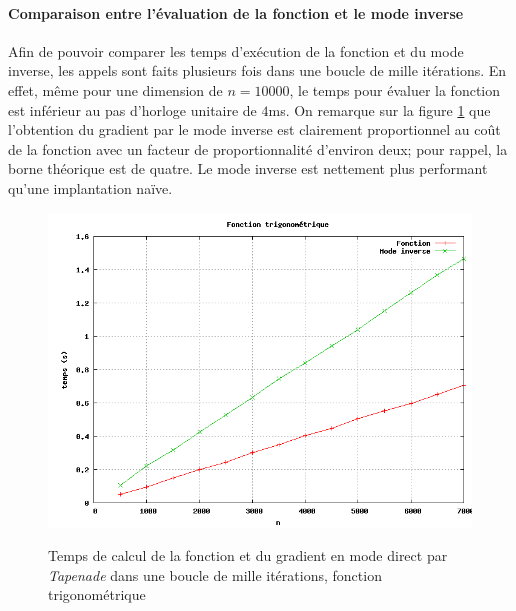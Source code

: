 






 \paragraph{Comparaison entre l'\'evaluation de la fonction et le mode inverse}

Afin de pouvoir comparer les temps d'ex\'ecution de la fonction et du mode inverse, les appels sont faits
plusieurs fois dans une boucle de mille it\'erations. En effet, même pour une dimension de $n=10000$,
 le temps pour \'evaluer la fonction est inf\'erieur au pas d'horloge unitaire de $4$ms. On remarque sur la
 figure \ref{fig:temps2} que l'obtention du gradient par le mode
inverse est clairement proportionnel au coût de la fonction avec un facteur de proportionnalit\'e d'environ
deux; pour rappel, la borne th\'eorique est de quatre. Le mode inverse est nettement plus performant qu'une implantation na\"ive.


\begin{figure}
\caption{Temps de calcul de la fonction et du gradient en mode direct par {\it Tapenade} dans une boucle de mille it\'erations, fonction trigonom\'etrique}
\center
\includegraphics[scale=0.4]{figures/temps2.png}
\label{fig:temps2}
\end{figure}


